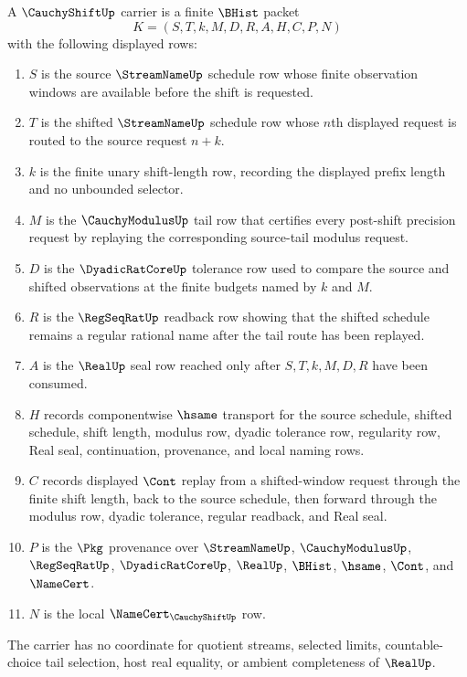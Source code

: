 \begin{definition}
\label{def:cauchy-shift-carrier-surface}
A $\CauchyShiftUp$ carrier is a finite $\BHist$ packet
$$
K=(S,T,k,M,D,R,A,H,C,P,N)
$$
with the following displayed rows:
\begin{enumerate}
\item $S$ is the source $\StreamNameUp$ schedule row whose finite observation windows are available before the shift is requested.
\item $T$ is the shifted $\StreamNameUp$ schedule row whose $n$th displayed request is routed to the source request $n+k$.
\item $k$ is the finite unary shift-length row, recording the displayed prefix length and no unbounded selector.
\item $M$ is the $\CauchyModulusUp$ tail row that certifies every post-shift precision request by replaying the corresponding source-tail modulus request.
\item $D$ is the $\DyadicRatCoreUp$ tolerance row used to compare the source and shifted observations at the finite budgets named by $k$ and $M$.
\item $R$ is the $\RegSeqRatUp$ readback row showing that the shifted schedule remains a regular rational name after the tail route has been replayed.
\item $A$ is the $\RealUp$ seal row reached only after $S,T,k,M,D,R$ have been consumed.
\item $H$ records componentwise $\hsame$ transport for the source schedule, shifted schedule, shift length, modulus row, dyadic tolerance row, regularity row, Real seal, continuation, provenance, and local naming rows.
\item $C$ records displayed $\Cont$ replay from a shifted-window request through the finite shift length, back to the source schedule, then forward through the modulus row, dyadic tolerance, regular readback, and Real seal.
\item $P$ is the $\Pkg$ provenance over $\StreamNameUp$, $\CauchyModulusUp$, $\RegSeqRatUp$, $\DyadicRatCoreUp$, $\RealUp$, $\BHist$, $\hsame$, $\Cont$, and $\NameCert$.
\item $N$ is the local $\NameCert_{\CauchyShiftUp}$ row.
\end{enumerate}
The carrier has no coordinate for quotient streams, selected limits, countable-choice tail selection, host real equality, or ambient completeness of $\RealUp$.
\end{definition}

